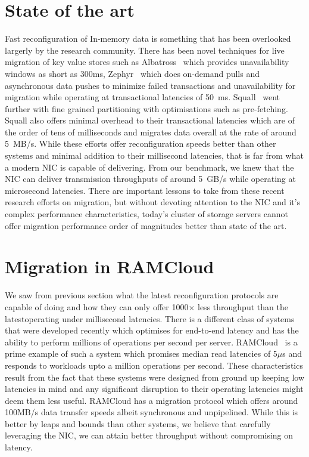 \section{State of the art}
Fast reconfiguration of In-memory data is something that has been overlooked largerly
by the research community. There has been novel techniques for live migration of 
key value stores such as Albatross~\cite{albatross} which provides unavailability windows 
as short as 300ms, Zephyr~\cite{zephyr} which does on-demand pulls and asynchronous data 
pushes to minimize failed transactions and unavailability for migration while operating 
at transactional latencies of 50~ms. Squall~\cite{squall} went further with fine grained 
partitioning with optimisations such as pre-fetching. Squall also offers minimal overhead 
to their transactional latencies which are of the order of tens of milliseconds and migrates 
data overall at the rate of around 5~MB/s. While these efforts offer reconfiguration speeds 
better than other systems and minimal addition to their millisecond latencies, that is far 
from what a modern NIC is capable of delivering. From our benchmark, we knew that the NIC 
can deliver transmission throughputs of around 5~GB/s while operating at microsecond latencies. 
There are important lessons to take from these recent research efforts on migration, but without 
devoting attention to the NIC and it's complex performance characteristics, today's cluster of
storage servers cannot offer migration performance order of magnitudes better than state of the art.

\section{Migration in RAMCloud}
We saw from previous section what the latest reconfiguration protocols are capable of doing and how they can only 
offer 1000$\times$ less throughput than the latestoperating under millisecond latencies. There is a different class of systems~\cite{ramcloud,farm,rdmabillion,herd} that 
were developed recently which optimises for end-to-end latency and has the ability to perform millions of operations 
per second per server. RAMCloud~\cite{ramcloud} is a prime example of such a system which promises median read latencies 
of 5$\mu$s and responds to workloads upto a million operations per second. These characteristics result from the fact that 
these systems were designed from ground up keeping low latencies in mind and any significant disruption to their operating 
latencies might deem them less useful. RAMCloud has a migration protocol which offers around 100MB/s data transfer speeds albeit 
synchronous and unpipelined. While this is better by leaps and bounds than other systems, we believe that carefully leveraging the NIC, 
we can attain better throughput without compromising on latency.

